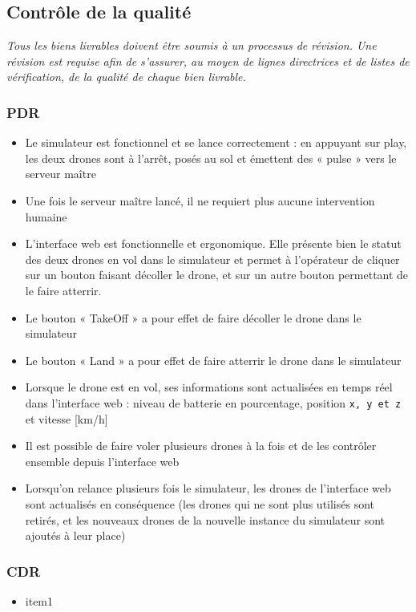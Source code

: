 \documentclass{mistcoursedoc}
\begin{document}
\subsection{Contrôle de la qualité}

\textit{Tous les biens livrables doivent être soumis à un processus de révision. Une révision est requise afin de s’assurer, au moyen de lignes directrices et de listes de vérification, de la qualité de chaque bien livrable.}
\subsubsection{PDR}
  \begin{itemize}
    \item Le simulateur est fonctionnel et se lance correctement : en appuyant sur play, les deux drones sont à l'arrêt, posés au sol et émettent des « pulse » vers le serveur maître
    \item Une fois le serveur maître lancé, il ne requiert plus aucune intervention humaine
    \item L'interface web est fonctionnelle et ergonomique. Elle présente bien le statut des deux drones en vol dans le simulateur et permet à l'opérateur de cliquer sur un bouton faisant décoller le drone, et sur un autre bouton permettant de le faire atterrir.
    \item Le bouton « TakeOff » a pour effet de faire décoller le drone dans le simulateur
    \item Le bouton « Land » a pour effet de faire atterrir le drone dans le simulateur
    \item Lorsque le drone est en vol, ses informations sont actualisées en temps réel dans l'interface web : niveau de batterie en pourcentage, position \texttt{x, y et z} et vitesse [km/h]
    \item Il est possible de faire voler plusieurs drones à la fois et de les contrôler ensemble depuis l'interface web
    \item Lorsqu'on relance plusieurs fois le simulateur, les drones de l'interface web sont actualisés en conséquence (les drones qui ne sont plus utilisés sont retirés, et les nouveaux drones de la nouvelle instance du simulateur sont ajoutés à leur place)
  \end{itemize}

\subsubsection{CDR}
\begin{itemize}
  \item item1
\end{itemize}
\end{document}
